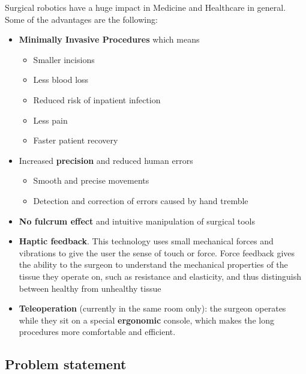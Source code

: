 Surgical robotics have a huge impact in Medicine and Healthcare in general. Some of the advantages are the following:
\begin{itemize}
\item \textbf{Minimally Invasive Procedures} which means
	\begin{itemize}
	\item Smaller incisions
	\item Less blood loss
	\item Reduced risk of inpatient infection
	\item Less pain
	\item Faster patient recovery
	\end{itemize}
\item Increased \textbf{precision} and reduced human errors
	\begin{itemize}
	\item Smooth and precise movements
	\item Detection and correction of errors caused by hand tremble
	\end{itemize}
\item \textbf{No fulcrum effect} and intuitive manipulation of surgical tools
\item \textbf{Haptic feedback}. This technology uses small mechanical forces and vibrations to give the user the sense of touch or force. Force feedback gives the ability to the surgeon to understand the 
mechanical properties of the tissue they operate on, such as resistance and elasticity, and thus distinguish between healthy from unhealthy tissue
\item \textbf{Teleoperation} (currently in the same room only): the surgeon operates while they sit on a special \textbf{ergonomic} console, which makes 
the long procedures more comfortable and efficient.
\end{itemize} 

\subsection{Problem statement}

